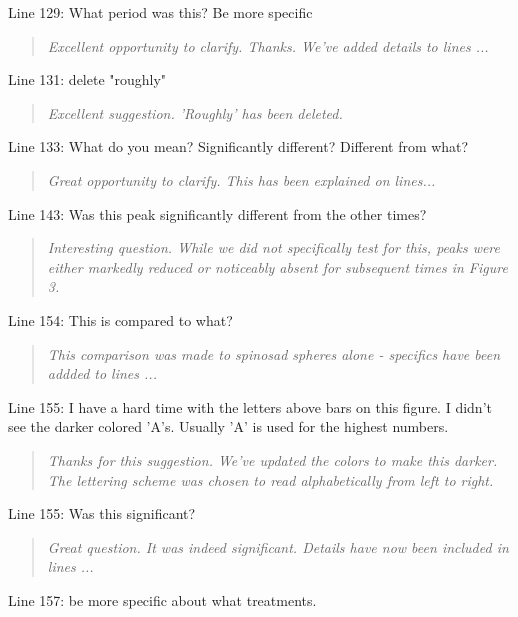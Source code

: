 \documentclass{article}
\begin{document}
Line 129: What period was this? Be more specific

\begin{quote}
    \textit{Excellent opportunity to clarify.  Thanks.  We've added details to lines ...}
\end{quote}

Line 131: delete "roughly"

\begin{quote}
    \textit{Excellent suggestion.  'Roughly' has been deleted.  }
\end{quote}

Line 133: What do you mean? Significantly different? Different from what?

\begin{quote}
    \textit{Great opportunity to clarify.  This has been explained on lines...}
\end{quote}

Line 143: Was this peak significantly different from the other times?

\begin{quote}
    \textit{Interesting question.  While we did not specifically test for this, peaks were either markedly reduced or noticeably absent for subsequent times in Figure 3.  }
\end{quote}

Line 154: This is compared to what?

\begin{quote}
    \textit{This comparison was made to spinosad spheres alone - specifics have been addded to lines ...}
\end{quote}

Line 155: I have a hard time with the letters above bars on this figure. I didn't see the darker colored 'A's. Usually 'A' is used for the highest numbers.

\begin{quote}
    \textit{Thanks for this suggestion.  We've updated the colors to make this darker.  The lettering scheme was chosen to read alphabetically from left to right.  }
\end{quote}

Line 155: Was this significant?

\begin{quote}
    \textit{Great question.  It was indeed significant.  Details have now been included in lines ...}
\end{quote}

Line 157: be more specific about what treatments.  
\end{document}

